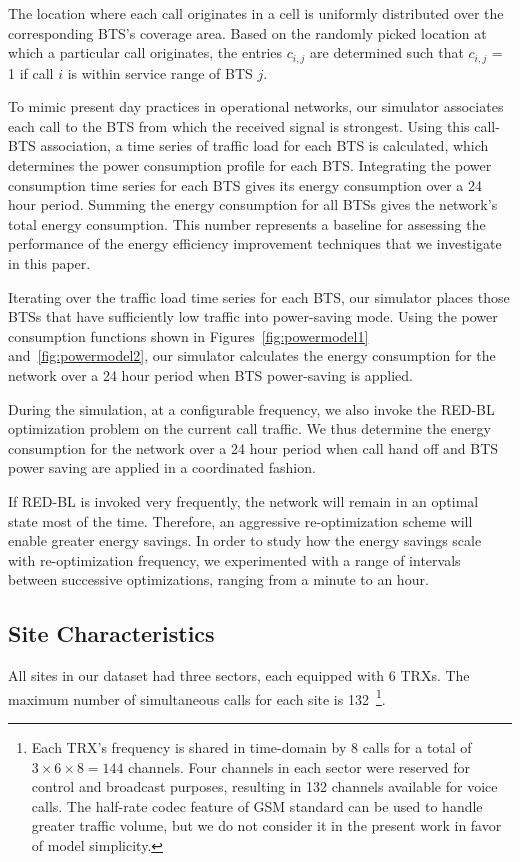 The location where each call originates in a cell is uniformly distributed over the corresponding BTS's coverage area. Based on the randomly picked location at which a particular call originates, the entries $c_{i,j}$ are determined such that $c_{i,j}$ = 1 if call $i$ is within service range of BTS $j$.

To mimic present day practices in operational networks, our simulator associates each call to the BTS from which the received signal is strongest. Using this call-BTS association, a time series of traffic load for each BTS is calculated, which determines the power consumption profile for each BTS. Integrating the power consumption time series for each BTS gives its energy consumption over a 24 hour period. Summing the energy consumption for all BTSs gives the network's total energy consumption. This number represents a baseline for assessing the performance of the energy efficiency improvement techniques that we investigate in this paper.

Iterating over the traffic load time series for each BTS, our simulator places those BTSs that have sufficiently low traffic into power-saving mode. Using the power consumption functions shown in Figures~\ref{fig:powermodel1} and~\ref{fig:powermodel2}, our simulator calculates the energy consumption for the network over a 24 hour period when BTS power-saving is applied.

During the simulation, at a configurable frequency, we also invoke the RED-BL optimization problem on the current call traffic. We thus determine the energy consumption for the network over a 24 hour period when call hand off and BTS power saving are applied in a coordinated fashion.

If RED-BL is invoked very frequently, the network will remain in an optimal state most of the time. Therefore, an aggressive re-optimization scheme will enable greater energy savings. In order to study how the energy savings scale with re-optimization frequency, we experimented with a range of intervals between successive optimizations, ranging from a minute to an hour.

\subsection{Site Characteristics}
\label{subsec:sitetypes} All sites in our dataset had three sectors, each equipped with 6 TRXs. The maximum number of simultaneous calls for each site is 132~\footnote{Each TRX's frequency is shared in time-domain  by 8 calls for  a total of $3\times6\times8=144$ channels. Four channels in each sector were reserved for control and broadcast purposes, resulting in 132 channels available for voice calls. The half-rate codec feature of GSM standard can be used to handle greater traffic volume, but we do not consider it in the present work in favor of model simplicity.}. 


